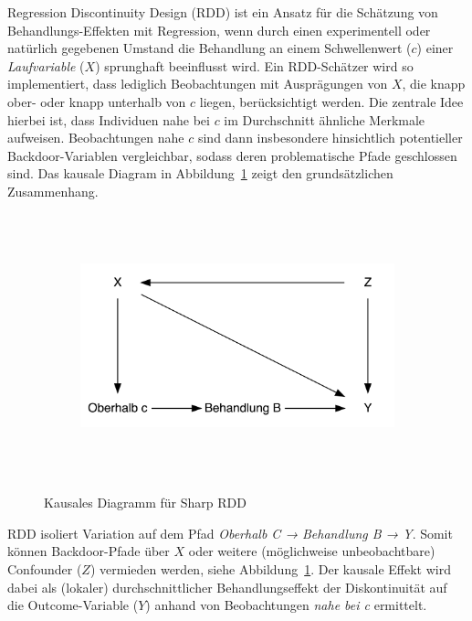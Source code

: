 \documentclass[
  a4paper,
  DIV=11,
  oneside]{scrreprt}
\begin{document}
Regression Discontinuity Design (RDD) ist ein Ansatz für die Schätzung
von Behandlungs-Effekten mit Regression, wenn durch einen experimentell
oder natürlich gegebenen Umstand die Behandlung an einem Schwellenwert
(\(c\)) einer \emph{Laufvariable} (\(X\)) sprunghaft beeinflusst wird.
Ein RDD-Schätzer wird so implementiert, dass lediglich Beobachtungen mit
Ausprägungen von \(X\), die knapp ober- oder knapp unterhalb von \(c\)
liegen, berücksichtigt werden. Die zentrale Idee hierbei ist, dass
Individuen nahe bei \(c\) im Durchschnitt ähnliche Merkmale aufweisen.
Beobachtungen nahe \(c\) sind dann insbesondere hinsichtlich
potentieller Backdoor-Variablen vergleichbar, sodass deren
problematische Pfade geschlossen sind. Das kausale Diagram in
Abbildung~\ref{fig-CDRDD} zeigt den grundsätzlichen Zusammenhang.

\begin{figure}

{\centering 

\begin{figure}[H]

{\centering \includegraphics[width=5in,height=3in]{RDD_files/figure-latex/dot-figure-1.png}

}

\end{figure}

}

\caption{\label{fig-CDRDD}Kausales Diagramm für Sharp RDD}

\end{figure}

RDD isoliert Variation auf dem Pfad \emph{Oberhalb C → Behandlung B →
Y}. Somit können Backdoor-Pfade über \(X\) oder weitere (möglichweise
unbeobachtbare) Confounder (\(Z\)) vermieden werden, siehe
Abbildung~\ref{fig-CDRDD}. Der kausale Effekt wird dabei als (lokaler)
durchschnittlicher Behandlungseffekt der Diskontinuität auf die
Outcome-Variable (\(Y\)) anhand von Beobachtungen \emph{nahe bei c}
ermittelt.
\end{document}
